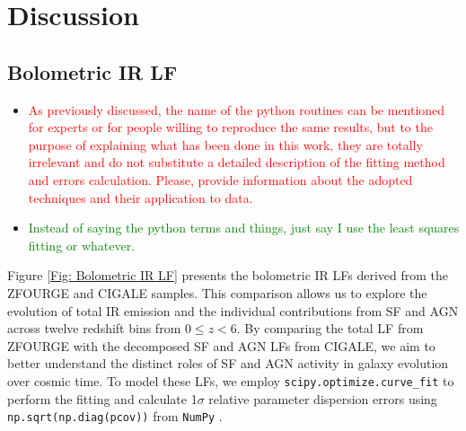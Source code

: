 \section{Discussion} \label{Sec: Discussion}
\subsection{Bolometric IR LF} \label{Sec: Bolometric IR LF}

\begin{itemize}
    \item \textcolor{red}{As previously discussed, the name of the python routines can be mentioned for experts or for people willing to reproduce the same results, but to the purpose of explaining what has been done in this work, they are totally irrelevant and do not substitute a detailed description of the fitting method and errors calculation. Please, provide information about the adopted techniques and their application to data.}
    \item \textcolor{Green}{Instead of saying the python terms and things, just say I use the least squares fitting or whatever.}
\end{itemize}

Figure \ref{Fig: Bolometric IR LF} presents the bolometric IR LFs derived from the ZFOURGE and CIGALE samples. This comparison allows us to explore the evolution of total IR emission and the individual contributions from SF and AGN across twelve redshift bins from $0 \leq z < 6$. By comparing the total LF from ZFOURGE with the decomposed SF and AGN LFs from CIGALE, we aim to better understand the distinct roles of SF and AGN activity in galaxy evolution over cosmic time. To model these LFs, we employ \texttt{scipy.optimize.curve\_fit} \citep{virtanen_scipy_2020} to perform the fitting and calculate 1$\sigma$ relative parameter dispersion errors using \texttt{np.sqrt(np.diag(pcov))} from \texttt{NumPy} \citep{harris_array_2020}. 

